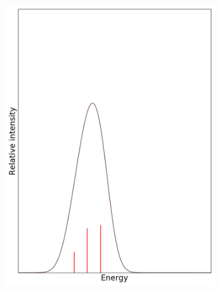 \documentclass[12pt, fleqn]{beamer}
\begin{document}
\begin{frame}
\begin{overlayarea}{\textwidth}{14cm}
{\begin{figure}[h!]
\begin{subfigure}[b]{0.45\linewidth}
                    \includegraphics[width=\linewidth]{fc_sp/sp_2.png}
                \end{subfigure}
            \end{figure}
        }
\end{overlayarea}
\end{frame}
\end{document}
